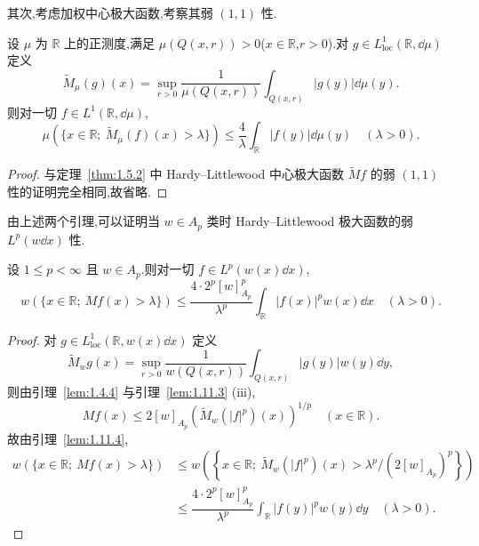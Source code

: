 其次,考虑加权中心极大函数,考察其弱 $(1,1)$ 性.

\begin{lemma}\label{lem:1.11.4}
设 $\mu$ 为 $\mathbb{R}$ 上的正测度,满足 $\mu(Q(x, r)) > 0$($x \in \mathbb{R}$,$r > 0$).对 $g \in L_{\mathrm{loc}}^{1}(\mathbb{R}, \dd\mu)$ 定义
\begin{equation*}
\tilde{M}_{\mu}(g)(x) = \sup_{r > 0}\frac{1}{\mu(Q(x, r))}\int_{Q(x, r)}|g(y)|\dd\mu(y).
\end{equation*}
则对一切 $f \in L^{1}(\mathbb{R}, \dd\mu)$,
\begin{equation*}
\mu(\{x \in \mathbb{R};\ \tilde{M}_{\mu}(f)(x) > \lambda\}) \leq \frac{4}{\lambda}\int_{\mathbb{R}}|f(y)|\dd\mu(y) \quad (\lambda > 0).
\end{equation*}
\end{lemma}

\begin{proof}
与定理~\ref{thm:1.5.2} 中 Hardy--Littlewood 中心极大函数 $\tilde{M}f$ 的弱 $(1,1)$ 性的证明完全相同,故省略.
\end{proof}

由上述两个引理,可以证明当 $w \in A_{p}$ 类时 Hardy--Littlewood 极大函数的弱 $L^{p}(w\dd x)$ 性.

\begin{theorem}\label{thm:1.11.5}
设 $1 \leq p < \infty$ 且 $w \in A_{p}$.则对一切 $f \in L^{p}(w(x)\dd x)$,
\begin{equation*}
w(\{x \in \mathbb{R};\ Mf(x) > \lambda\}) \leq \frac{4\cdot 2^{p}[w]_{A_{p}}^{p}}{\lambda^{p}}\int_{\mathbb{R}}|f(x)|^{p}w(x)\dd x \quad (\lambda > 0).
\end{equation*}
\end{theorem}

\begin{proof}
对 $g \in L_{\mathrm{loc}}^{1}(\mathbb{R}, w(x)\dd x)$ 定义
\begin{equation*}
\tilde{M}_{w}g(x) = \sup_{r > 0}\frac{1}{w(Q(x, r))}\int_{Q(x, r)}|g(y)|w(y)\dd y,
\end{equation*}
则由引理~\ref{lem:1.4.4} 与引理~\ref{lem:1.11.3} (iii),
\begin{equation*}
Mf(x) \leq 2[w]_{A_{p}}\left(\tilde{M}_{w}(|f|^{p})(x)\right)^{1/p} \quad (x \in \mathbb{R}).
\end{equation*}
故由引理~\ref{lem:1.11.4},
\begin{align*}
w(\{x \in \mathbb{R};\ Mf(x) > \lambda\}) &\leq w\left(\left\{x \in \mathbb{R};\ \tilde{M}_{w}(|f|^{p})(x) > \lambda^{p}/(2[w]_{A_{p}})^{p}\right\}\right) \\
&\leq \dfrac{4\cdot 2^{p}[w]_{A_{p}}^{p}}{\lambda^{p}}\displaystyle\int_{\mathbb{R}}|f(y)|^{p}w(y)\dd y \quad (\lambda > 0).
\end{align*}
\end{proof}

